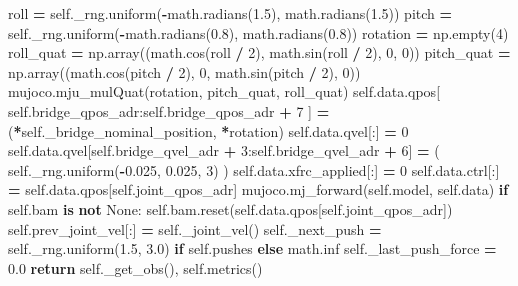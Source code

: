 \documentclass[
  american,
  11pt,
  letterpaper,
]{article}
\newenvironment{Shaded}{\begin{snugshade}}{\end{snugshade}}
\newcommand{\ControlFlowTok}[1]{\textcolor[rgb]{0.13,0.29,0.53}{\textbf{#1}}}
\newcommand{\DecValTok}[1]{\textcolor[rgb]{0.00,0.00,0.81}{#1}}
\newcommand{\FloatTok}[1]{\textcolor[rgb]{0.00,0.00,0.81}{#1}}
\newcommand{\KeywordTok}[1]{\textcolor[rgb]{0.13,0.29,0.53}{\textbf{#1}}}
\newcommand{\NormalTok}[1]{#1}
\newcommand{\OperatorTok}[1]{\textcolor[rgb]{0.81,0.36,0.00}{\textbf{#1}}}
\newcommand{\VariableTok}[1]{\textcolor[rgb]{0.00,0.00,0.00}{#1}}
\renewenvironment{Shaded}{\par\smallskip}{\par\smallskip}
\begin{document}
\begin{Shaded}
\begin{Highlighting}[]
\NormalTok{        roll }\OperatorTok{=} \VariableTok{self}\NormalTok{.\_rng.uniform(}\OperatorTok{{-}}\NormalTok{math.radians(}\FloatTok{1.5}\NormalTok{), math.radians(}\FloatTok{1.5}\NormalTok{))}
\NormalTok{        pitch }\OperatorTok{=} \VariableTok{self}\NormalTok{.\_rng.uniform(}\OperatorTok{{-}}\NormalTok{math.radians(}\FloatTok{0.8}\NormalTok{), math.radians(}\FloatTok{0.8}\NormalTok{))}
\NormalTok{        rotation }\OperatorTok{=}\NormalTok{ np.empty(}\DecValTok{4}\NormalTok{)}
\NormalTok{        roll\_quat }\OperatorTok{=}\NormalTok{ np.array((math.cos(roll }\OperatorTok{/} \DecValTok{2}\NormalTok{), math.sin(roll }\OperatorTok{/} \DecValTok{2}\NormalTok{), }\DecValTok{0}\NormalTok{, }\DecValTok{0}\NormalTok{))}
\NormalTok{        pitch\_quat }\OperatorTok{=}\NormalTok{ np.array((math.cos(pitch }\OperatorTok{/} \DecValTok{2}\NormalTok{), }\DecValTok{0}\NormalTok{, math.sin(pitch }\OperatorTok{/} \DecValTok{2}\NormalTok{), }\DecValTok{0}\NormalTok{))}
\NormalTok{        mujoco.mju\_mulQuat(rotation, pitch\_quat, roll\_quat)}
        \VariableTok{self}\NormalTok{.data.qpos[}
            \VariableTok{self}\NormalTok{.bridge\_qpos\_adr:}\VariableTok{self}\NormalTok{.bridge\_qpos\_adr }\OperatorTok{+} \DecValTok{7}
\NormalTok{        ] }\OperatorTok{=}\NormalTok{ (}\OperatorTok{*}\VariableTok{self}\NormalTok{.\_bridge\_nominal\_position, }\OperatorTok{*}\NormalTok{rotation)}
        \VariableTok{self}\NormalTok{.data.qvel[:] }\OperatorTok{=} \DecValTok{0}
        \VariableTok{self}\NormalTok{.data.qvel[}\VariableTok{self}\NormalTok{.bridge\_qvel\_adr }\OperatorTok{+} \DecValTok{3}\NormalTok{:}\VariableTok{self}\NormalTok{.bridge\_qvel\_adr }\OperatorTok{+} \DecValTok{6}\NormalTok{] }\OperatorTok{=}\NormalTok{ (}
            \VariableTok{self}\NormalTok{.\_rng.uniform(}\OperatorTok{{-}}\FloatTok{0.025}\NormalTok{, }\FloatTok{0.025}\NormalTok{, }\DecValTok{3}\NormalTok{)}
\NormalTok{        )}
        \VariableTok{self}\NormalTok{.data.xfrc\_applied[:] }\OperatorTok{=} \DecValTok{0}
        \VariableTok{self}\NormalTok{.data.ctrl[:] }\OperatorTok{=} \VariableTok{self}\NormalTok{.data.qpos[}\VariableTok{self}\NormalTok{.joint\_qpos\_adr]}
\NormalTok{        mujoco.mj\_forward(}\VariableTok{self}\NormalTok{.model, }\VariableTok{self}\NormalTok{.data)}
        \ControlFlowTok{if} \VariableTok{self}\NormalTok{.bam }\KeywordTok{is} \KeywordTok{not} \VariableTok{None}\NormalTok{:}
            \VariableTok{self}\NormalTok{.bam.reset(}\VariableTok{self}\NormalTok{.data.qpos[}\VariableTok{self}\NormalTok{.joint\_qpos\_adr])}
        \VariableTok{self}\NormalTok{.prev\_joint\_vel[:] }\OperatorTok{=} \VariableTok{self}\NormalTok{.\_joint\_vel()}
        \VariableTok{self}\NormalTok{.\_next\_push }\OperatorTok{=} \VariableTok{self}\NormalTok{.\_rng.uniform(}\FloatTok{1.5}\NormalTok{, }\FloatTok{3.0}\NormalTok{) }\ControlFlowTok{if} \VariableTok{self}\NormalTok{.pushes }\ControlFlowTok{else}\NormalTok{ math.inf}
        \VariableTok{self}\NormalTok{.\_last\_push\_force }\OperatorTok{=} \FloatTok{0.0}
        \ControlFlowTok{return} \VariableTok{self}\NormalTok{.\_get\_obs(), }\VariableTok{self}\NormalTok{.metrics()}


\end{Highlighting}
\end{Shaded}
\end{document}
